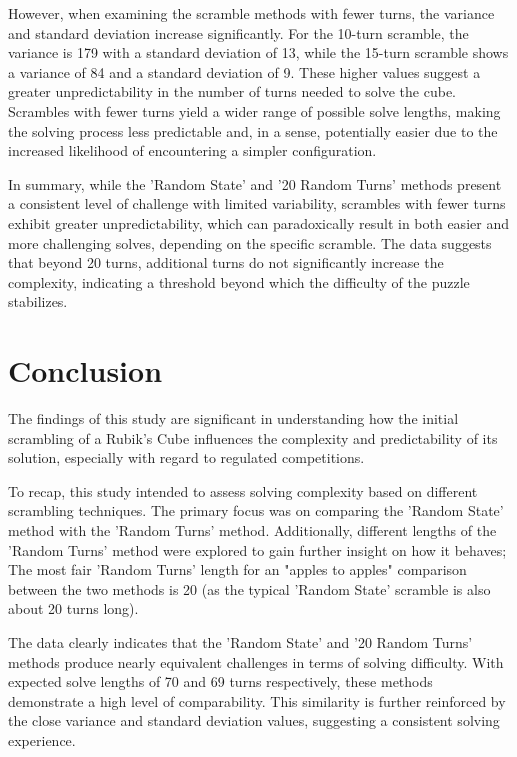 \documentclass[12pt,letterpaper]{article}
\numberwithin{equation}{section}
\begin{document}
However, when examining the scramble methods with fewer turns, the variance and standard deviation increase significantly. For the 10-turn scramble, the variance is 179 with a standard deviation of 13, while the 15-turn scramble shows a variance of 84 and a standard deviation of 9. These higher values suggest a greater unpredictability in the number of turns needed to solve the cube. Scrambles with fewer turns yield a wider range of possible solve lengths, making the solving process less predictable and, in a sense, potentially easier due to the increased likelihood of encountering a simpler configuration.

In summary, while the 'Random State' and '20 Random Turns' methods present a consistent level of challenge with limited variability, scrambles with fewer turns exhibit greater unpredictability, which can paradoxically result in both easier and more challenging solves, depending on the specific scramble. The data suggests that beyond 20 turns, additional turns do not significantly increase the complexity, indicating a threshold beyond which the difficulty of the puzzle stabilizes.


\newpage

\section{Conclusion}

The findings of this study are significant in understanding how the initial scrambling of a Rubik's Cube influences the complexity and predictability of its solution, especially with regard to regulated competitions. 

To recap, this study intended to assess solving complexity based on different scrambling techniques. The primary focus was on comparing the 'Random State' method with the 'Random Turns' method. Additionally, different lengths of the 'Random Turns' method were explored to gain further insight on how it behaves; The most fair 'Random Turns' length for an "apples to apples" comparison between the two methods is 20 (as the typical 'Random State' scramble is also about 20 turns long).

The data clearly indicates that the 'Random State' and '20 Random Turns' methods produce nearly equivalent challenges in terms of solving difficulty. With expected solve lengths of 70 and 69 turns respectively, these methods demonstrate a high level of comparability. This similarity is further reinforced by the close variance and standard deviation values, suggesting a consistent solving experience.
\end{document}
